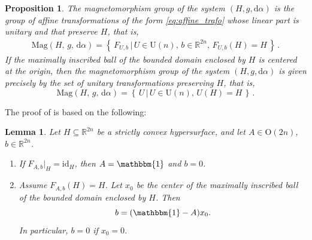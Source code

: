 \documentclass[11pt,reqno]{amsart}
\newcommand{\IR}{{\mathbb R}}%
\renewcommand{\O}{\mathrm{O}}
\theoremstyle{plain}
\newtheorem{lem}[thm]{Lemma}
\newtheorem{prop}[thm]{Proposition}
\theoremstyle{definition}
\numberwithin{equation}{section}
\def\d{\delta}
\def\d{\delta}
\def\d{{\mathrm{d}}}
\def\id{\mathrm{id}}
\newcommand{\set}[2]{\left\{ \, #1  \, | \,  #2 \, \right\}}
\begin{document}
\begin{prop}
\label{prop: magnetomorphism group}
The magnetomorphism group of the system $(H,g,\d\alpha)$ is the group of affine transformations of the form \eqref{eq:affine_trafo} whose linear part is unitary and that preserve $H$, that is,
\begin{align*}
\mathrm{Mag}(H , \, g , \, \d\alpha)=\set{F_{U,b}}{ U \in \mathrm{U}(n),\, b \in \IR^{2n},\, F_{U,b}(H) = H }\, .
\end{align*}
If the maximally inscribed ball of the bounded domain enclosed by $H$ is centered at the origin, then the magnetomorphism group of the system $(H,g,\d\alpha)$ is given precisely by the set of unitary transformations preserving $H$, that is,
\[
\mathrm{Mag}(H , \, g , \, \d\alpha)=\set{U}{ U \in \mathrm{U}(n),\, U(H) = H }\, .
\]
\end{prop}
The proof of  is based on the following: 
\begin{lem}
\label{lem:affine_rigidity_and_translation}
Let $H \subseteq \IR^{2n}$ be a strictly convex hypersurface, and let $A \in \O(2n)$, $b \in \IR^{2n}$.

\begin{enumerate}
\item\label{it:1 affine_rigidity_and_translation}If $F_{A,b}|_H = \id_H$, then $A = \mathbbm{1}$ and $b = 0$.

\item\label{it:2 affine_rigidity_and_translation} Assume $F_{A,b}(H) = H$. Let $x_0$ be the center of the maximally inscribed ball of the bounded domain enclosed by $H$. Then
\[
b = (\mathbbm{1}-A)x_0.
\]
In particular, $b=0$ if $x_0=0$.
\end{enumerate}
\end{lem}
\end{document}
